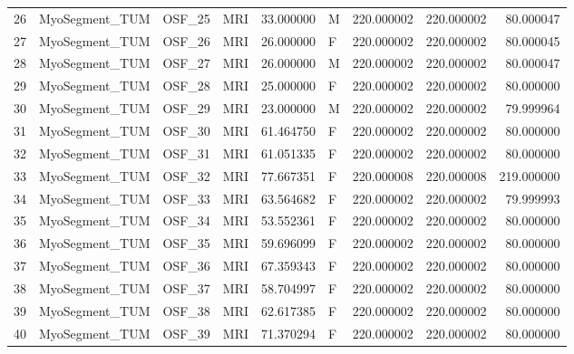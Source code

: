 \begin{tabular}{llllrlrrr}
26     &  MyoSegment\_TUM &       OSF\_25 &                MRI &  33.000000 &        M &       220.000002 &    220.000002 &   80.000047 \\
27     &  MyoSegment\_TUM &       OSF\_26 &                MRI &  26.000000 &        F &       220.000002 &    220.000002 &   80.000045 \\
28     &  MyoSegment\_TUM &       OSF\_27 &                MRI &  26.000000 &        M &       220.000002 &    220.000002 &   80.000047 \\
29     &  MyoSegment\_TUM &       OSF\_28 &                MRI &  25.000000 &        F &       220.000002 &    220.000002 &   80.000000 \\
30     &  MyoSegment\_TUM &       OSF\_29 &                MRI &  23.000000 &        M &       220.000002 &    220.000002 &   79.999964 \\
31     &  MyoSegment\_TUM &       OSF\_30 &                MRI &  61.464750 &        F &       220.000002 &    220.000002 &   80.000000 \\
32     &  MyoSegment\_TUM &       OSF\_31 &                MRI &  61.051335 &        F &       220.000002 &    220.000002 &   80.000000 \\
33     &  MyoSegment\_TUM &       OSF\_32 &                MRI &  77.667351 &        F &       220.000008 &    220.000008 &  219.000000 \\
34     &  MyoSegment\_TUM &       OSF\_33 &                MRI &  63.564682 &        F &       220.000002 &    220.000002 &   79.999993 \\
35     &  MyoSegment\_TUM &       OSF\_34 &                MRI &  53.552361 &        F &       220.000002 &    220.000002 &   80.000000 \\
36     &  MyoSegment\_TUM &       OSF\_35 &                MRI &  59.696099 &        F &       220.000002 &    220.000002 &   80.000000 \\
37     &  MyoSegment\_TUM &       OSF\_36 &                MRI &  67.359343 &        F &       220.000002 &    220.000002 &   80.000000 \\
38     &  MyoSegment\_TUM &       OSF\_37 &                MRI &  58.704997 &        F &       220.000002 &    220.000002 &   80.000000 \\
39     &  MyoSegment\_TUM &       OSF\_38 &                MRI &  62.617385 &        F &       220.000002 &    220.000002 &   80.000000 \\
40     &  MyoSegment\_TUM &       OSF\_39 &                MRI &  71.370294 &        F &       220.000002 &    220.000002 &   80.000000 \\

\end{tabular}
